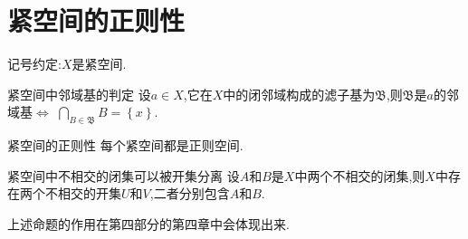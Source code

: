 \section{紧空间的正则性}

记号约定:$X$是紧空间.

\begin{proposition}{紧空间中邻域基的判定}{}
	设$a\in X$,它在$X$中的闭邻域构成的滤子基为$\mathfrak{B}$,则$\mathfrak{B}$是$a$的邻域基$\iff$ $\bigcap\limits_{B\in\mathfrak{B}}B=\left\{x\right\}$.
\end{proposition}

\begin{corollary}{紧空间的正则性}{}
	每个紧空间都是正则空间.
\end{corollary}

\begin{proposition}{紧空间中不相交的闭集可以被开集分离}{}
	设$A$和$B$是$X$中两个不相交的闭集,则$X$中存在两个不相交的开集$U$和$V$,二者分别包含$A$和$B$.
\end{proposition}

\begin{remark}{}{}
	上述命题的作用在第四部分的第四章中会体现出来.
\end{remark}
